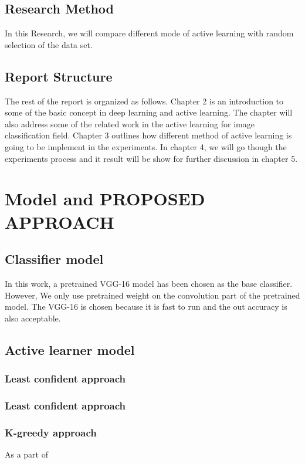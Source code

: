 \section{Research Method}
\label{sec:researchMethod}
In this Research, we will compare different mode of active learning with random selection of the data set.




\section{Report Structure}
\label{sec:reportStructure}
The rest of the report is organized as follows. 
Chapter 2 is an introduction to some of the basic concept in deep learning and active learning. The chapter will also address some of the related work in the active learning for image classification field. Chapter 3 outlines how different method of active learning is going to be implement in the experiments. In chapter 4, we will go though the experiments process and it result will be show for further discussion in chapter 5.


\chapter{Model and PROPOSED APPROACH}
\label{sec:architectureAndModel}
\section{Classifier model}
In this work, a pretrained VGG-16 model has been chosen as the base classifier. However, We only use pretrained weight on the convolution part of the pretrained model. The VGG-16 is chosen because it is fast to run and the out accuracy is also acceptable. 
\section{Active learner model}
\subsection{Least confident approach}
\subsection{Least confident approach}
\subsection{K-greedy approach}
As a part of 
